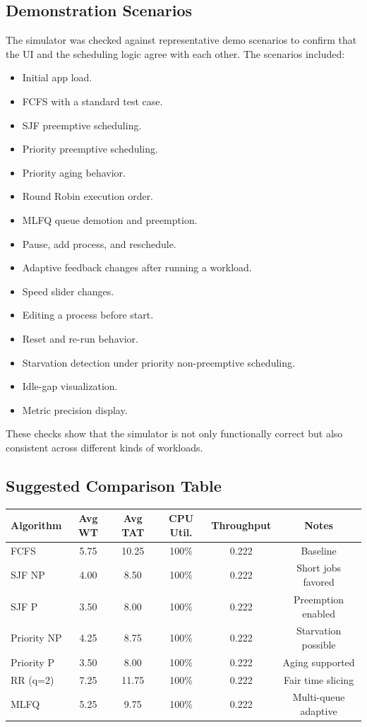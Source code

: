 \documentclass[12pt]{article}
\begin{document}
\subsection{Demonstration Scenarios}
The simulator was checked against representative demo scenarios to confirm that the UI and the scheduling logic agree with each other. The scenarios included:
\begin{itemize}[leftmargin=*]
    \item Initial app load.
    \item FCFS with a standard test case.
    \item SJF preemptive scheduling.
    \item Priority preemptive scheduling.
    \item Priority aging behavior.
    \item Round Robin execution order.
    \item MLFQ queue demotion and preemption.
    \item Pause, add process, and reschedule.
    \item Adaptive feedback changes after running a workload.
    \item Speed slider changes.
    \item Editing a process before start.
    \item Reset and re-run behavior.
    \item Starvation detection under priority non-preemptive scheduling.
    \item Idle-gap visualization.
    \item Metric precision display.
\end{itemize}

These checks show that the simulator is not only functionally correct but also consistent across different kinds of workloads.

\subsection{Suggested Comparison Table}




\begin{center}
\begin{tabular}{lccccc}
\toprule
Algorithm & Avg WT & Avg TAT & CPU Util. & Throughput & Notes \\
\midrule
FCFS & 5.75 & 10.25 & 100\% & 0.222 & Baseline \\
SJF NP & 4.00 & 8.50 & 100\% & 0.222 & Short jobs favored \\
SJF P & 3.50 & 8.00 & 100\% & 0.222 & Preemption enabled \\
Priority NP & 4.25 & 8.75 & 100\% & 0.222 & Starvation possible \\
Priority P & 3.50 & 8.00 & 100\% & 0.222 & Aging supported \\
RR (q=2) & 7.25 & 11.75 & 100\% & 0.222 & Fair time slicing \\
MLFQ & 5.25 & 9.75 & 100\% & 0.222 & Multi-queue adaptive \\
\bottomrule
\end{tabular}
\end{center}
\end{document}
